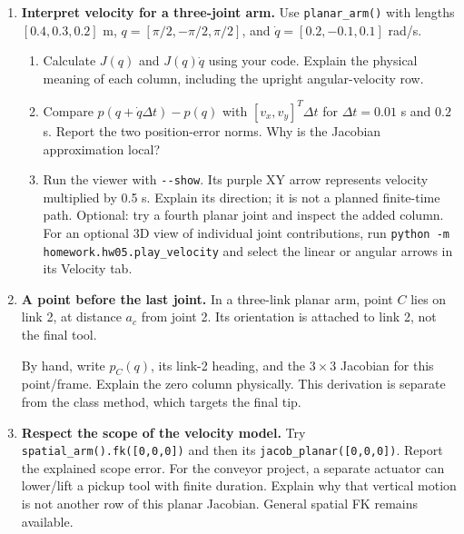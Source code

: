 \newpage
\begin{enumerate}[start=3]
\item \textbf{Interpret velocity for a three-joint arm.}
Use \texttt{planar\_arm()} with lengths $[0.4,0.3,0.2]$ m,
$q=[\pi/2,-\pi/2,\pi/2]$, and $\dot q=[0.2,-0.1,0.1]$ rad/s.
\begin{enumerate}
\item Calculate $J(q)$ and $J(q)\dot q$ using your code. Explain the physical
meaning of each column, including the upright angular-velocity row.
\item Compare $p(q+\dot q\Delta t)-p(q)$ with
$[v_x,v_y]^T\Delta t$ for $\Delta t=0.01$ s and $0.2$ s.
Report the two position-error norms. Why is the Jacobian approximation local?
\item Run the viewer with \texttt{-{}-show}. Its purple XY arrow represents
velocity multiplied by 0.5 s. Explain its direction; it is not a planned
finite-time path. Optional: try a fourth planar joint and inspect the added column.
For an optional 3D view of individual joint contributions, run
\texttt{python -m homework.hw05.play\_velocity} and select the linear or
angular arrows in its Velocity tab.
\end{enumerate}

\item \textbf{A point before the last joint.}
In a three-link planar arm, point $C$ lies on link 2, at distance $a_c$ from
joint 2. Its orientation is attached to link 2, not the final tool.
\begin{center}
\end{center}
By hand, write $p_C(q)$, its link-2 heading, and the $3\times3$ Jacobian
for this point/frame. Explain the zero column physically. This derivation
is separate from the class method, which targets the final tip.

\item \textbf{Respect the scope of the velocity model.}
Try \texttt{spatial\_arm().fk([0,0,0])} and then its
\texttt{jacob\_planar([0,0,0])}. Report the explained scope error.
For the conveyor project, a separate actuator can lower/lift a pickup tool
with finite duration. Explain why that vertical motion is not another row
of this planar Jacobian. General spatial FK remains available.
\end{enumerate}

\submission

